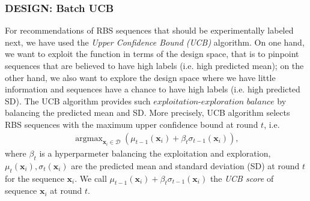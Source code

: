     
    

\subsubsection{DESIGN: Batch UCB}

For recommendations of RBS sequences that should be experimentally labeled next, we have used the \textit{Upper Confidence Bound (UCB)} algorithm.
On one hand, we want to exploit the function in terms of the design space, that is to pinpoint sequences that are believed to have high labels (i.e. high predicted mean); 
on the other hand, we also want to explore the design space where we have little information and sequences have a chance to have high labels (i.e. high predicted SD).
The UCB algorithm provides such $\textit{exploitation-exploration balance}$ by balancing the predicted mean and SD.
More precisely, UCB algorithm selects RBS sequences with the maximum upper confidence bound at round $t$, i.e.
\begin{align}
\label{Eq: GPUCB}
    \operatorname{argmax}_{\mathbf{x}_i \in \mathcal{D}} \left( \mu_{t-1}(\mathbf{x}_i) + \beta_t \sigma_{t-1}(\mathbf{x}_i)\right),
\end{align}
where $\beta_t$ is a hyperparmeter balancing the exploitation and exploration, 
$\mu_t(\mathbf{x}_i), \sigma_t(\mathbf{x}_i)$ are the predicted mean and standard deviation (SD) at round $t$ for the sequence $\mathbf{x}_i$.
We call $\mu_{t-1}(\mathbf{x}_i) + \beta_t \sigma_{t-1}(\mathbf{x}_i)$ the \textit{UCB score} of sequence $\mathbf{x}_i$ at round $t$.

